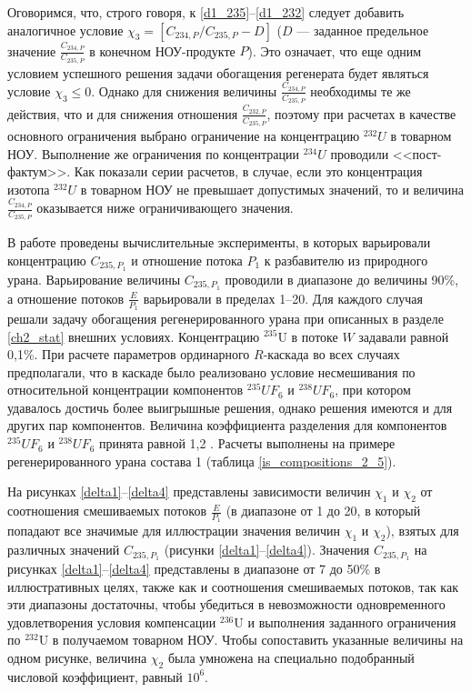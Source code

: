 Оговоримся, что, строго говоря, к \ref{d1_235}--\ref{d1_232} следует добавить аналогичное условие $\chi_3=\left[C_{234,P}/C_{235,P}-D\right]$ ($D$ --- заданное предельное значение $\frac{C_{234,P}}{C_{235,P}}$ в конечном НОУ-продукте $P$). Это означает, что еще одним условием успешного решения задачи обогащения регенерата будет являться условие $\chi_3 \leq0$. Однако для снижения величины $\frac{C_{234,P}}{C_{235,P}}$ необходимы те же действия, что и для снижения отношения $\frac{C_{232,P}}{C_{235,P}}$, поэтому при расчетах в качестве основного ограничения выбрано ограничение на концентрацию $^{232}U$ в товарном НОУ. Выполнение же ограничения по концентрации $^{234}U$ проводили <<пост-фактум>>. Как показали серии расчетов, в случае, если это концентрация изотопа $^{232}U$ в товарном НОУ не превышает допустимых значений, то и величина $\frac{C_{234,P}}{C_{235,P}}$ оказывается ниже ограничивающего значения.

В работе проведены вычислительные эксперименты, в которых варьировали концентрацию $C_{235, P_1}$ и отношение потока $P_1$ к разбавителю из природного урана. Варьирование величины $C_{235, P_1}$ проводили в диапазоне до величины 90\%, а отношение потоков $\frac{E}{P_1}$ варьировали в пределах 1--20. Для каждого случая решали задачу обогащения регенерированного урана при описанных в разделе \ref{ch2_stat} внешних условиях. Концентрацию $^{235}$U в потоке $W$ задавали равной 0,1\%. При расчете параметров ординарного $R$-каскада во всех случаях предполагали, что в каскаде было реализовано условие несмешивания по относительной концентрации компонентов $^{235}UF_6$ и $^{238}UF_6$, при котором удавалось достичь более выигрышные решения, однако решения имеются и для других пар компонентов. Величина коэффициента разделения для компонентов  $^{235}UF_6$ и $^{238}UF_6$ принята равной 1,2 \cite{smirnovEvolutionIsotopicComposition2012}. Расчеты выполнены на примере регенерированного урана состава 1 (таблица \ref{is_compositions_2_5}).

На рисунках \ref{delta1}--\ref{delta4} представлены зависимости величин $\chi_1$ и $\chi_2$ от соотношения смешиваемых потоков $\frac{E}{P_1}$ (в диапазоне от 1 до 20, в который попадают все значимые для иллюстрации значения величин $\chi_1$ и $\chi_2$), взятых для различных значений $C_{235, P_1}$ (рисунки \ref{delta1}--\ref{delta4}). Значения $C_{235, P_1}$ на рисунках \ref{delta1}--\ref{delta4} представлены в диапазоне от 7 до 50\% в иллюстративных целях,  также как и соотношения смешиваемых потоков, так как эти диапазоны достаточны, чтобы убедиться в невозможности одновременного удовлетворения условия компенсации $^{236}$U и выполнения заданного ограничения по $^{232}$U в получаемом товарном НОУ. Чтобы сопоставить указанные величины на одном рисунке, величина $\chi_2$ была умножена на специально подобранный числовой коэффициент, равный $10^{6}$.

